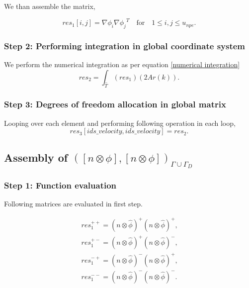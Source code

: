 \documentclass[a4paper,twoside,openright]{book}
\begin{document}
We than assemble the matrix,
 
\begin{equation}
res_1[i,j]= {\nabla \phi_i} {\nabla \phi_j}^T \quad \textrm{for} \quad 1 \leq i,j \leq u_{npe} \textrm{.}
\end{equation}

\subsubsection{Step 2: Performing integration in global coordinate system}

We perform the numerical integration as per equation \eqref{numerical integration} 
\begin{equation}
res_2 = \int_{\hat{T}} (res_1) (2 Ar(k)) \textrm{.}
\end{equation}

\subsubsection{Step 3: Degrees of freedom allocation in global matrix}
 
Looping over each element and performing following operation in each loop,
\begin{equation}
res_3[ids\_velocity,ids\_velocity]=res_2 \textrm{.}
\end{equation}


\subsection{Assembly of $([n \otimes \phi], [n \otimes \phi])_{\Gamma \cup \Gamma_D}$}

\subsubsection{Step 1: Function evaluation} 

Following matrices are evaluated in first step.

\begin{equation}
\begin{split}
res_1^{++} = (n \otimes \hat{\phi})^+ (n \otimes \hat{\phi})^+ \textrm{,}\\
res_1^{+-} = (n \otimes \hat{\phi})^+ (n \otimes \hat{\phi})^- \textrm{,}\\
res_1^{-+} = (n \otimes \hat{\phi})^- (n \otimes \hat{\phi})^+ \textrm{,}\\
res_1^{--} = (n \otimes \hat{\phi})^- (n \otimes \hat{\phi})^- \textrm{.}\\
\end{split}
\end{equation}
\end{document}

